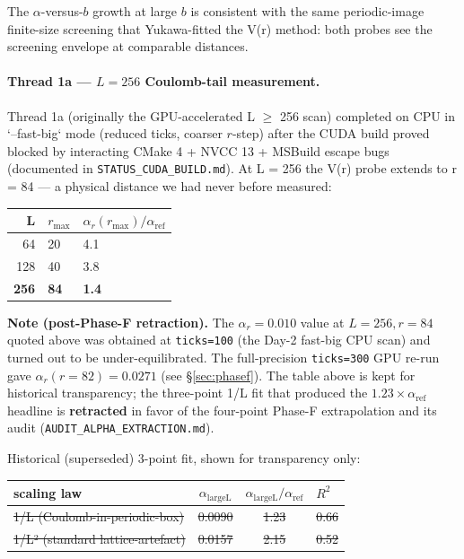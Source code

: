 \documentclass[11pt,letterpaper]{article}
\newcommand{\alphaLargeL}{\alpha_{\mathrm{largeL}}}
\begin{document}
The $\alpha$-versus-$b$ growth at large $b$ is consistent with the same
periodic-image finite-size screening that Yukawa-fitted the V(r)
method: both probes see the screening envelope at comparable distances.

\paragraph{Thread 1a --- $L = 256$ Coulomb-tail measurement.}
Thread 1a (originally the GPU-accelerated L $\ge$ 256 scan) completed on
CPU in `--fast-big` mode (reduced ticks, coarser $r$-step) after the
CUDA build proved blocked by interacting CMake 4 + NVCC 13 + MSBuild
escape bugs (documented in \texttt{STATUS\_CUDA\_BUILD.md}). At L = 256
the V(r) probe extends to r = 84 --- a physical distance we had never
before measured:

\begin{center}
\begin{tabular}{rll}
\toprule
L & $r_{\max}$ & $\alpha_r(r_{\max}) / \alpha_{\mathrm{ref}}$ \\
\midrule
64 & 20 & 4.1 \\
128 & 40 & 3.8 \\
\textbf{256} & \textbf{84} & \textbf{1.4} \\
\bottomrule
\end{tabular}
\end{center}

\textbf{Note (post-Phase-F retraction).} The $\alpha_r = 0.010$ value
at $L = 256, r = 84$ quoted above was obtained at \verb|ticks=100|
(the Day-2 fast-big CPU scan) and turned out to be
under-equilibrated. The full-precision \verb|ticks=300| GPU re-run
gave $\alpha_r(r=82) = 0.0271$ (see \S\ref{sec:phasef}). The table
above is kept for historical transparency; the three-point 1/L fit
that produced the $1.23\times\alpha_{\text{ref}}$ headline is
\textbf{retracted} in favor of the four-point Phase-F extrapolation
and its audit (\texttt{AUDIT\_ALPHA\_EXTRACTION.md}).

Historical (superseded) 3-point fit, shown for transparency only:

\begin{center}
\begin{tabular}{lccl}
\toprule
scaling law & $\alphaLargeL$ & $\alphaLargeL / \alpha_{\mathrm{ref}}$ & $R^2$ \\
\midrule
\sout{1/L (Coulomb-in-periodic-box)} & \sout{0.0090} & \sout{1.23} & \sout{0.66} \\
\sout{1/L² (standard lattice-artefact)} & \sout{0.0157} & \sout{2.15} & \sout{0.52} \\
\bottomrule
\end{tabular}
\end{center}
\end{document}
